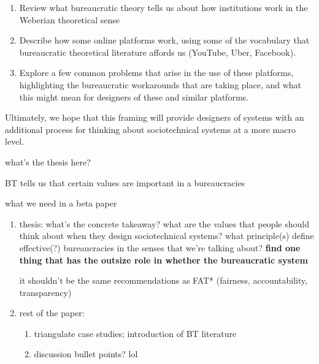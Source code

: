 \documentclass[main]{subfiles}
\begin{document}
\begin{enumerate}
  \item Review what bureaucratic theory tells us about how institutions work in the Weberian theoretical sense
  \item Describe how some online platforms work, using some of the vocabulary that bureaucratic theoretical literature affords us (YouTube, Uber, Facebook).
  \item Explore a few common problems that arise in the use of these platforms, highlighting the bureaucratic workarounds that are taking place, and what this might mean for designers of these and similar platforms.
\end{enumerate}

Ultimately, we hope that this framing will provide designers of systems with an additional process for thinking about sociotechnical systems at a more macro level.


what's the thesis here?

BT tells us that certain values are important in a bureaucracies



what we need in a beta paper
\begin{enumerate}
  \item thesis: what's the concrete takeaway? what are the values that people should think about when they design sociotechnical systems? what principle(s) define effective(?) bureaucracies in the senses that we're talking about?  \textbf{find one thing that has the outsize role in whether the bureaucratic system }

  it shouldn't be the same recommendations as FAT* (fairness, accountability, transparency)
  \item rest of the paper:
  \begin{enumerate}
    \item triangulate case studies; introduction of BT literature
    \item discussion bullet points? lol
  \end{enumerate}
\end{enumerate}






\onlyinsubfile{
  
  
}
\end{document}
